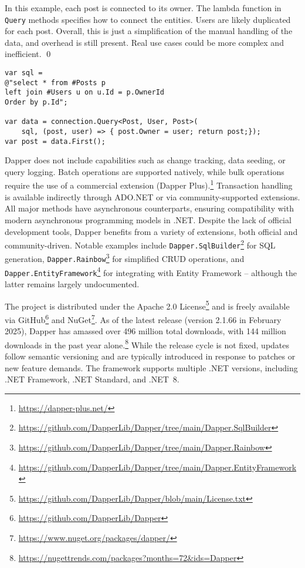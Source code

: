 \begin{example}
\small
In this example, each post is connected to its owner. The lambda function in \texttt{Query} methods specifies how to connect the entities. Users are likely duplicated for each post. Overall, this is just a simplification of the manual handling of the data, and overhead is still present. Real use cases could be more complex and inefficient.
\qed

\begin{lstlisting}[language=CSharp]
var sql =
@"select * from #Posts p
left join #Users u on u.Id = p.OwnerId
Order by p.Id";

var data = connection.Query<Post, User, Post>(
    sql, (post, user) => { post.Owner = user; return post;});
var post = data.First();
\end{lstlisting}
\end{example}

Dapper does not include capabilities such as change tracking, data seeding, or query logging. Batch operations are supported natively, while bulk operations require the use of a commercial extension (Dapper Plus).\footnote{\url{https://dapper-plus.net/}} Transaction handling is available indirectly through ADO.NET or via community-supported extensions. All major methods have asynchronous counterparts, ensuring compatibility with modern asynchronous programming models in .NET. Despite the lack of official development tools, Dapper benefits from a variety of extensions, both official and community-driven. Notable examples include \texttt{Dapper.SqlBuilder}\footnote{\url{https://github.com/DapperLib/Dapper/tree/main/Dapper.SqlBuilder}} for SQL generation, \texttt{Dapper.Rainbow}\footnote{\url{https://github.com/DapperLib/Dapper/tree/main/Dapper.Rainbow}} for simplified CRUD operations, and \texttt{Dapper.EntityFramework}\footnote{\url{https://github.com/DapperLib/Dapper/tree/main/Dapper.EntityFramework}} for integrating with Entity Framework -- although the latter remains largely undocumented.

The project is distributed under the Apache 2.0 License\footnote{\url{https://github.com/DapperLib/Dapper/blob/main/License.txt}} and is freely available via GitHub\footnote{\url{https://github.com/DapperLib/Dapper}} and NuGet\footnote{\url{https://www.nuget.org/packages/dapper/}}. As of the latest release (version 2.1.66 in February 2025), Dapper has amassed over 496 million total downloads, with 144 million downloads in the past year alone.\footnote{\url{https://nugettrends.com/packages?months=72&ids=Dapper}} While the release cycle is not fixed, updates follow semantic versioning and are typically introduced in response to patches or new feature demands. The framework supports multiple .NET versions, including .NET Framework, .NET Standard, and .NET~8.

